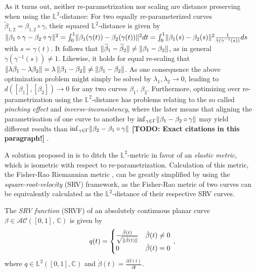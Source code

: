 As it turns out, neither re-parametrization nor scaling are distance preserving when using the $\mathbb{L}^2$-distance:
For two equally re-parameterized curves $\widetilde\beta_{1,2} = \beta_{1,2} \circ \gamma$, their squared $\mathbb{L}^2$-distance is given by $\lVert\beta_1 \circ \gamma - \beta_2 \circ \gamma\rVert^2 = \int_0^1 \lVert\beta_1(\gamma(t)) - \beta_2(\gamma(t))\rVert^2 dt = \int_0^1 \lVert\beta_1(s) - \beta_2(s)\rVert^2 \frac{1}{\dot\gamma(\gamma^{-1}(s))} ds$ with $s = \gamma(t)$.
It follows that $\lVert\widetilde\beta_1 - \widetilde\beta_2\rVert \neq \lVert\beta_1 - \beta_2\rVert$, as in general $\dot\gamma(\gamma^{-1}(s)) \neq 1$.
Likewise, it holds for equal re-scaling that $\lVert\lambda \beta_1 - \lambda \beta_2\rVert = \lambda\, \lVert\beta_1 - \beta_2\rVert \neq \lVert\beta_1 - \beta_2\rVert$.
As one consequence the above optimization problem might simply be solved by $\lambda_1, \lambda_2 \rightarrow 0$, leading to $d([\beta_1], [\beta_2]) \rightarrow 0$ for any two curves $\beta_1$, $\beta_2$.
Furthermore, optimizing over re-parametrization using the $\mathbb{L}^2$-distance has problems relating to the so called \textit{pinching effect} and \textit{inverse-inconsistency}, where the later means that aligning the parametrisation of one curve to another by $\inf_{\gamma \in \Gamma} \lVert\beta_1 - \beta_2 \circ \gamma\rVert$ may yield different results than $\inf_{\gamma \in \Gamma} \lVert\beta_2 - \beta_1 \circ \gamma\rVert$ \textbf{[TODO: Exact citations in this paragraph!]} \parencite[see][88]{SrivastavaKlassen2016}.

A solution proposed in \cite{SrivastavaEtAl2011} is to ditch the $\mathbb{L}^2$-metric in favor of an \textit{elastic metric}, which is isometric with respect to re-parametrization.
Calculation of this metric, the Fisher-Rao Riemannian metric \parencite{Rao1945}, can be greatly simplified by using the \textit{square-root-velocity} (SRV) framework, as the Fisher-Rao metric of two curves can be equivalently calculated as the $\mathbb{L}^2$-distance of their respective SRV curves.

\begin{definition}
  The \emph{SRV function} (SRVF) of an absolutely continuous planar curve $\beta \in \mathcal{AC}([0,1],\,\mathbb{C})$ is given by 
  $$ \quad q(t) = 
    \begin{cases}
      \frac{\dot{\beta}(t)}{\sqrt{\lVert\dot{\beta}(t)\rVert}} & \dot{\beta}(t) \neq 0 \\
      0 & \dot{\beta}(t) = 0
    \end{cases}\,, $$
  where $q \in \mathbb{L}^2([0,1], \mathbb{C})$ and $\dot\beta(t) = \frac{\partial\beta(t)}{\partial t}$.
\end{definition}

